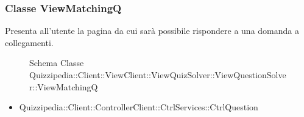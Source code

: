 \subsubsection{Classe ViewMatchingQ}
Presenta all'utente la pagina da cui sarà possibile rispondere a una domanda a collegamenti.
\begin{figure}[H]
\centering
\noindent{}
\caption[Schema Classe ViewMatchingQ]{Schema Classe Quizzipedia::Client::ViewClient::ViewQuizSolver::ViewQuestionSolver::ViewMatchingQ}
\end{figure}
\begin{itemize}
\item Quizzipedia::Client::ControllerClient::CtrlServices::CtrlQuestion
\end{itemize}
